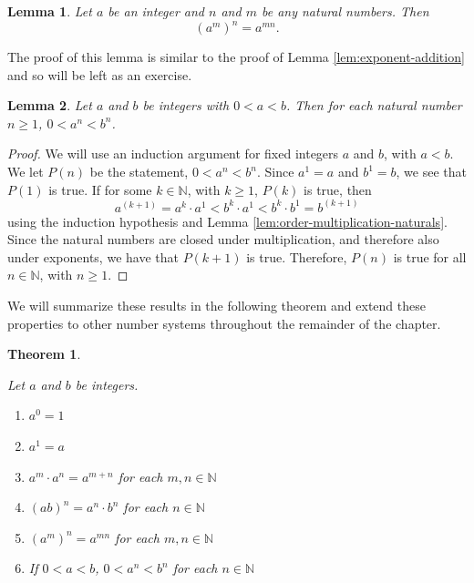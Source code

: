 \documentclass[
]{book}
\newtheorem{theorem}{Theorem}[chapter]
\newtheorem{lemma}{Lemma}[chapter]
\theoremstyle{definition}
\theoremstyle{definition}
\theoremstyle{definition}
\theoremstyle{definition}
\theoremstyle{remark}
\begin{document}
\begin{lemma}
\protect\hypertarget{lem:exponent-product}{}\label{lem:exponent-product}Let \(a\) be an integer and \(n\) and \(m\) be any natural numbers. Then \[(a^m)^n = a^{mn}.\]
\end{lemma}

The proof of this lemma is similar to the proof of Lemma \ref{lem:exponent-addition} and so will be left as an exercise.

\begin{lemma}
Let \(a\) and \(b\) be integers with \(0<a<b\). Then for each natural number \(n\geq 1\), \(0<a^n<b^n\).
\end{lemma}

\begin{proof}
We will use an induction argument for fixed integers \(a\) and \(b\), with \(a<b\). We let \(P(n)\) be the statement, \(0<a^n<b^n\). Since \(a^1=a\) and \(b^1=b\), we see that \(P(1)\) is true. If for some \(k\in \mathbb{N}\), with \(k\geq 1\), \(P(k)\) is true, then
\[a^{(k+1)}=a^k\cdot a^1 < b^k \cdot a^1 < b^k \cdot b^1 = b^{(k+1)}\] using the induction hypothesis and Lemma \ref{lem:order-multiplication-naturals}. Since the natural numbers are closed under multiplication, and therefore also under exponents, we have that \(P(k+1)\) is true. Therefore, \(P(n)\) is true for all \(n\in \mathbb{N}\), with \(n\geq 1\).
\end{proof}

We will summarize these results in the following theorem and extend these properties to other number systems throughout the remainder of the chapter.

\begin{theorem}
\protect\hypertarget{thm:exponents-integers}{}\label{thm:exponents-integers}

Let \(a\) and \(b\) be integers.

\begin{enumerate}
\def\labelenumi{\alph{enumi}.}
\item
  \(a^0=1\)
\item
  \(a^1=a\)
\item
  \(a^m\cdot a^n = a^{m+n}\) for each \(m,n\in \mathbb{N}\)
\item
  \((ab)^n=a^n\cdot b^n\) for each \(n\in \mathbb{N}\)
\item
  \((a^m)^n = a^{mn}\) for each \(m,n\in \mathbb{N}\)
\item
  If \(0<a<b\), \(0<a^n<b^n\) for each \(n\in \mathbb{N}\)
\end{enumerate}

\end{theorem}
\end{document}

